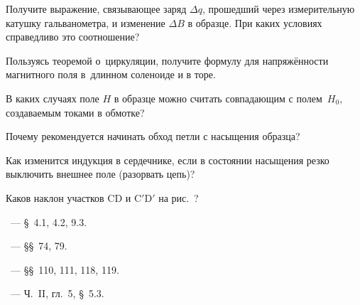 \begin{lab:questions}

	\item Получите выражение, связывающее заряд $\Delta q$, прошедший через
    измерительную катушку гальванометра, и изменение $\Delta B$ в образце.
    При каких условиях справедливо это соотношение?

	\item Пользуясь теоремой о~циркуляции, получите формулу для напряжённости
магнитного поля в~длинном соленоиде и в торе.

    \item В каких случаях поле $H$ в образце можно считать совпадающим
    с полем~$H_0$, создаваемым токами в обмотке?

    \item Почему рекомендуется начинать обход петли с насыщения образца?

    \item Как изменится индукция в сердечнике, если в состоянии насыщения
    резко выключить внешнее поле (разорвать цепь)?
    
    \item Каков наклон участков CD и C$'$D$'$ на рис.~?
    
\end{lab:questions}


\begin{lab:literature}
    \item \Kirichenko~--- \S~4.1, 4.2, 9.3.

	\item \SivuhinIII~--- \S\S~74, 79.

	\item \Kalashnikov~--- \S\S~110, 111, 118, 119.

	\item \KingLokOlh~--- Ч.~II, гл.~5, \S~5.3.
    

\end{lab:literature}
